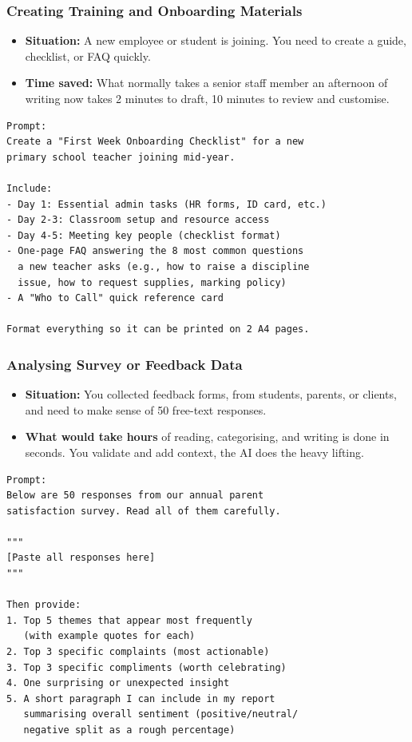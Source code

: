\begin{frame}[fragile]\frametitle{Creating Training and Onboarding Materials}

    \begin{itemize}
        \item \textbf{Situation:} A new employee or student is joining. You need to create a guide, checklist, or FAQ quickly.
        \item \textbf{Time saved:} What normally takes a senior staff member an afternoon of writing now takes 2 minutes to draft, 10 minutes to review and customise.
    \end{itemize}
		
\begin{lstlisting}[language=HTML]
Prompt:
Create a "First Week Onboarding Checklist" for a new 
primary school teacher joining mid-year.

Include:
- Day 1: Essential admin tasks (HR forms, ID card, etc.)
- Day 2-3: Classroom setup and resource access
- Day 4-5: Meeting key people (checklist format)
- One-page FAQ answering the 8 most common questions 
  a new teacher asks (e.g., how to raise a discipline 
  issue, how to request supplies, marking policy)
- A "Who to Call" quick reference card

Format everything so it can be printed on 2 A4 pages.
\end{lstlisting}



\end{frame}


\begin{frame}[fragile]\frametitle{Analysing Survey or Feedback Data}

    \begin{itemize}
        \item \textbf{Situation:} You collected feedback forms, from students, parents, or clients, and need to make sense of 50 free-text responses.
        \item \textbf{What would take hours} of reading, categorising, and writing is done in seconds. You validate and add context, the AI does the heavy lifting.
    \end{itemize}
		
\begin{lstlisting}[language=HTML]
Prompt:
Below are 50 responses from our annual parent 
satisfaction survey. Read all of them carefully.

"""
[Paste all responses here]
"""

Then provide:
1. Top 5 themes that appear most frequently 
   (with example quotes for each)
2. Top 3 specific complaints (most actionable)
3. Top 3 specific compliments (worth celebrating)
4. One surprising or unexpected insight
5. A short paragraph I can include in my report 
   summarising overall sentiment (positive/neutral/
   negative split as a rough percentage)
\end{lstlisting}



\end{frame}


